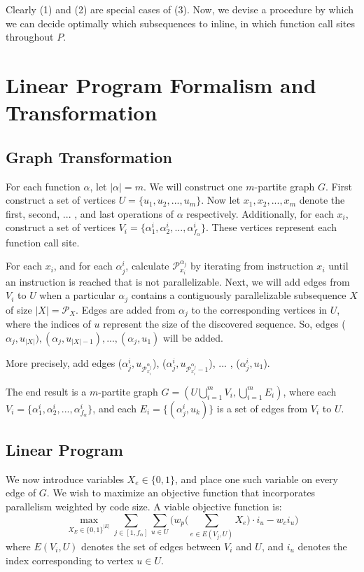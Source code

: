 \documentclass[12pt,twoside]{article}
\begin{document}
Clearly (1) and (2) are special cases of (3). Now, we devise a procedure by which we can decide optimally which subsequences to inline, in which function call sites throughout $P$.  

\section{Linear Program Formalism and Transformation}
\subsection{Graph Transformation}
For each function $\alpha$, let $|\alpha| = m$. We will construct one $m$-partite graph $G$. First construct a set of vertices $U = \{u_1, u_2, ... , u_{m}\}$. Now let $x_1, x_2, ... , x_{m}$ denote the first, second, ... , and last operations of $\alpha$ respectively. Additionally, for each $x_i$, construct a set of vertices $V_i = \{\alpha_1^i, \alpha_2^i, ... , \alpha_{f_{\alpha}}^i\}$. These vertices represent each function call site. 

For each $x_i$, and for each $\alpha_j^i$, calculate $\mathcal{P}_{x_i}^{\alpha_j}$ by iterating from instruction $x_i$ until an instruction is reached that is not parallelizable. Next, we will add edges from $V_i$ to $U$ when a particular $\alpha_j$ contains a contiguously parallelizable subsequence $X$ of size $|X| = \mathcal{P}_X$. Edges are added from $\alpha_j$ to the corresponding vertices in $U$, where the indices of $u$ represent the size of the discovered sequence. So, edges ($\alpha_j, u_{|X|}), (\alpha_j, u_{|X| - 1}), ... , (\alpha_j, u_1)$ will be added.  

More precisely, add edges ($\alpha_j^i,u_{\mathcal{P}_{x_i}^{\alpha_j}}$), ($\alpha_j^i,u_{\mathcal{P}_{x_i}^{\alpha_j}-1}$), ... , ($\alpha_j^i,u_1$).

The end result is a $m$-partite graph $G = (U \bigcup\limits_{i=1}^{m} V_i, \bigcup_{i=1}^{m} E_i)$, where each $V_i = \{\alpha_1^i, \alpha_2^i, ... , \alpha_{f_{\alpha}}^i\}$, and each $E_i = \{(\alpha_j^i, u_k)\}$ is a set of edges from $V_i$ to $U$.

\subsection{Linear Program}
We now introduce variables $X_e \in \{0,1\}$, and place one such variable on every edge of $G$. We wish to maximize an objective function that incorporates parallelism weighted by code size. A viable objective function is:
	\begin{equation}
		\max_{X_E \in \{0,1\}^{|E|}} \sum_{j \in [1,f_{\alpha}]}  \sum_{u \in U}\bigg(w_p\Big(\sum_{e \in E(V_j,U)} X_e\Big) \cdot i_u - w_ci_u\bigg) 
	\end{equation}
	where $E(V_i,U)$ denotes the set of edges between $V_i$ and $U$, and $i_u$ denotes the index corresponding to vertex $u \in U$.
\end{document}
